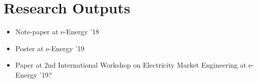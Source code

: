 \documentclass[12pt]{article}
\begin{document}
\clearpage

\section{Research Outputs}


\begin{itemize}
	\item Note-paper at e-Energy '18
	\item Poster at e-Energy '19
	\item Paper at 2nd International Workshop on Electricity Market Engineering at e-Energy '19?
\end{itemize}




\clearpage
\end{document}

